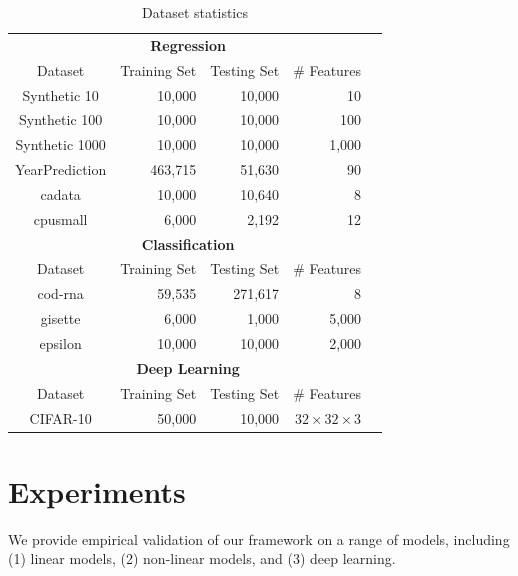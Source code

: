 \documentclass{article}
\begin{document}





\begin{table}[t]
\scriptsize
\centering
\begin{tabular}{crrrr}
\hline
\multicolumn{4}{c}{\bf Regression}\\
Dataset           & Training Set & Testing Set & \# Features  \\
\hline
Synthetic 10   & 10,000        & 10,000       & 10               \\
Synthetic 100  & 10,000        & 10,000       & 100              \\
Synthetic 1000 & 10,000        & 10,000       & 1,000           \\
YearPrediction & 463,715       & 51,630       & 90                  \\
cadata         & 10,000        & 10,640       & 8                   \\
cpusmall       & 6,000         & 2,192        & 12     \\
\hline
\hline
\multicolumn{4}{c}{\bf Classification}\\
Dataset           & Training Set & Testing Set & \# Features \\
\hline
cod-rna        & 59,535        & 271,617      & 8    \\
gisette        & 6,000         & 1,000        & 5,000  \\  
epsilon        & 10,000        & 10,000       & 2,000\\  
\hline
\hline
\multicolumn{4}{c}{\bf Deep Learning}\\
Dataset           & Training Set & Testing Set & \# Features \\
\hline
CIFAR-10        & 50,000        & 10,000      &$32\times 32\times 3$     \\
\hline
\end{tabular}
\caption{Dataset statistics}
\label{table:dataset}
\end{table}

\vspace{-0.5em}
\section{Experiments} \label{sec:exp}

\vspace{-0.5em}
We provide empirical validation of
our framework on a range of
models, including
(1) linear models, (2) non-linear models,
and (3) deep learning.
\end{document}
